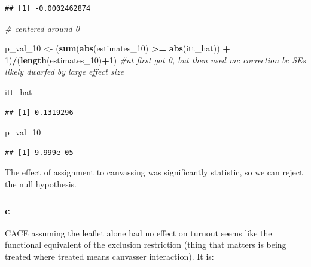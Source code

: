 \documentclass[
]{article}
\newenvironment{Shaded}{\begin{snugshade}}{\end{snugshade}}
\newcommand{\CommentTok}[1]{\textcolor[rgb]{0.56,0.35,0.01}{\textit{#1}}}
\newcommand{\DecValTok}[1]{\textcolor[rgb]{0.00,0.00,0.81}{#1}}
\newcommand{\FunctionTok}[1]{\textcolor[rgb]{0.13,0.29,0.53}{\textbf{#1}}}
\newcommand{\NormalTok}[1]{#1}
\newcommand{\OtherTok}[1]{\textcolor[rgb]{0.56,0.35,0.01}{#1}}
\newcommand{\SpecialCharTok}[1]{\textcolor[rgb]{0.81,0.36,0.00}{\textbf{#1}}}
\begin{document}
\begin{verbatim}
## [1] -0.0002462874
\end{verbatim}

\begin{Shaded}
\begin{Highlighting}[]
\CommentTok{\# centered around 0}


\NormalTok{p\_val\_10 }\OtherTok{\textless{}{-}}\NormalTok{ (}\FunctionTok{sum}\NormalTok{(}\FunctionTok{abs}\NormalTok{(estimates\_10) }\SpecialCharTok{\textgreater{}=} \FunctionTok{abs}\NormalTok{(itt\_hat)) }\SpecialCharTok{+} \DecValTok{1}\NormalTok{)}\SpecialCharTok{/}\NormalTok{(}\FunctionTok{length}\NormalTok{(estimates\_10)}\SpecialCharTok{+}\DecValTok{1}\NormalTok{) }\CommentTok{\#at first got 0, but then used mc correction bc SEs likely dwarfed by large effect size}

\NormalTok{itt\_hat}
\end{Highlighting}
\end{Shaded}

\begin{verbatim}
## [1] 0.1319296
\end{verbatim}

\begin{Shaded}
\begin{Highlighting}[]
\NormalTok{p\_val\_10}
\end{Highlighting}
\end{Shaded}

\begin{verbatim}
## [1] 9.999e-05
\end{verbatim}

The effect of assignment to canvassing was significantly statistic, so
we can reject the null hypothesis.

\subsubsection{c}\label{c-4}

CACE assuming the leaflet alone had no effect on turnout seems like the
functional equivalent of the exclusion restriction (thing that matters
is being treated where treated means canvasser interaction). It is:

\begin{Shaded}
\end{Shaded}
\end{document}
